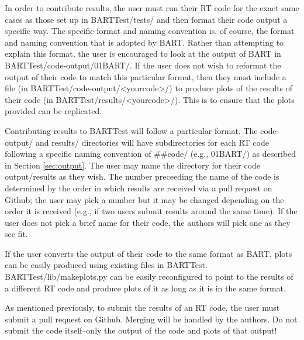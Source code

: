 \documentclass[letterpaper, 12pt]{article}
\begin{document}
In order to contribute results, the user must run their RT code for the exact 
same cases as those set up in BARTTest/tests/ and then format their code output 
a specific way. The specific format and naming convention is, of course, the 
format and naming convention that is adopted by BART. Rather than attempting 
to explain this format, the user is encouraged to look at the output of BART 
in BARTTest/code-output/01BART/. If the user does not wish to reformat the 
output of their code to match this particular format, then they must include a 
file (in BARTTest/code-output/{\textless}yourcode{\textgreater}/) to produce 
plots of the results of their 
code (in BARTTest/results/{\textless}yourcode{\textgreater}/). 
This is to ensure that the plots provided can be replicated.

Contributing results to BARTTest will follow a particular format. The 
code-output/ and results/ directories will have subdirectories for each RT 
code following a specific naming convention of {\#}{\#}code/ (e.g., 01BART/) as 
described in Section \ref{sec:output}. The user may name the directory for 
their code output/results as they wish. The number 
preceeding the name of the code is determined by the order 
in which results are received via a pull request on Github; the user may pick 
a number but it may be changed depending on the order it is received (e.g., if 
two users submit results around the same time). If the user does not pick 
a brief name for their code, the authors will pick one as they see fit. 

If the user converts the output of their code to the same format as BART, plots 
can be easily produced using existing files in BARTTest. 
BARTTest/lib/makeplots.py can be easily reconfigured to point to the results 
of a different RT code and produce plots of it as long as it is in the same 
format. 

As mentioned previously, to submit the results of an RT code, the user must 
submit a pull request on Github. Merging will be handled by the authors. Do 
not submit the code itself--only the output of the code and plots of 
that output!
\end{document}
